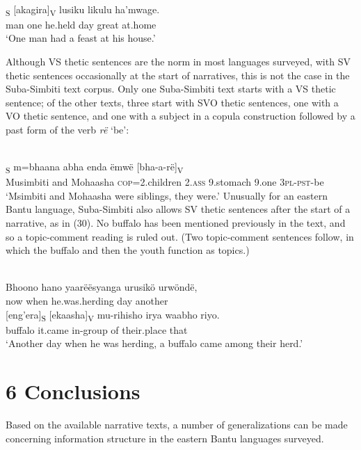 \documentclass[output=paper]{langsci/langscibook}
\begin{document}
\ea\label{ex:}
\\
\textsubscript{S} [akagira]\textsubscript{V} lusiku likulu ha’mwage.\\
man one he.held day great at.home\\
\upshape
‘One man had a feast at his house.’
\z

Although VS thetic sentences are the norm in most languages surveyed, with SV thetic sentences occasionally at the start of narratives, this is not the case in the Suba-Simbiti text corpus. Only one Suba-Simbiti text starts with a VS thetic sentence; of the other texts, three start with SVO thetic sentences, one with a VO thetic sentence, and one with a subject in a copula construction followed by a past form of the verb\emph{ rë} ‘be’:


\ea\label{ex:}
\\

\textsubscript{S} m=bhaana abha enda ëmwë [bha-a-rë]\textsubscript{V}\\
Musimbiti and Mohaasha \textsc{cop}=2.children 2.\textsc{ass }9.stomach 9.one \textsc{3pl-pst}{}-be\\


‘Msimbiti and Mohaasha were siblings, they were.’
\z
Unusually for an eastern Bantu language, Suba-Simbiti also allows SV thetic sentences after the start of a narrative, as in (30). No buffalo has been mentioned previously in the text, and so a topic-comment reading is ruled out. (Two topic-comment sentences follow, in which the buffalo and then the youth function as topics.)

\ea\label{ex:}
\\
\gll Bhoono hano yaarëësyanga urusikö urwöndë,\\
now when he.was.herding day another\\
\gll {}[eng’era]\textsubscript{S} [ekaasha]\textsubscript{V} mu-rihisho irya waabho riyo.\\
buffalo it.came in-group of their.place that\\
\upshape
‘Another day when he was herding, a buffalo came among their herd.’
\z
\section{6  Conclusions}

Based on the available narrative texts, a number of generalizations can be made concerning information structure in the eastern Bantu languages surveyed.
\end{document}
